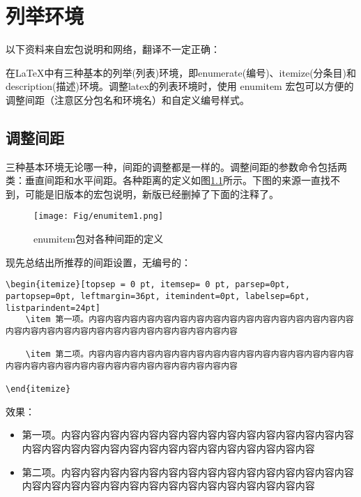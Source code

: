 \chapter{列举环境}
以下资料来自宏包说明和网络，翻译不一定正确：

在LaTeX中有三种基本的列举(列表)环境，即enumerate(编号)、itemize(分条目)和description(描述)环境。调整latex的列表环境时，使用 enumitem 宏包可以方便的调整间距（注意区分包名和环境名）和自定义编号样式。

\section{调整间距}
三种基本环境无论哪一种，间距的调整都是一样的。调整间距的参数命令包括两类：垂直间距和水平间距。各种距离的定义如图\ref{enumitem}所示。下图的来源一直找不到，可能是旧版本的宏包说明，新版已经删掉了下面的注释了。
\begin{figure}[htbp]
	\centering
	\texttt{[image: Fig/enumitem1.png]}
	\caption{\label{enumitem}enumitem包对各种间距的定义}
\end{figure}

现先总结出所推荐的间距设置，无编号的：
\begin{lstlisting}
\begin{itemize}[topsep = 0 pt, itemsep= 0 pt, parsep=0pt, partopsep=0pt, leftmargin=36pt, itemindent=0pt, labelsep=6pt, listparindent=24pt]
	\item 第一项。内容内容内容内容内容内容内容内容内容内容内容内容内容内容内容内容内容内容内容内容内容内容内容内容内容内容内容内容内容内容

	\item 第二项。内容内容内容内容内容内容内容内容内容内容内容内容内容内容内容内容内容内容内容内容内容内容内容内容内容内容内容内容内容内容
	
\end{itemize}
\end{lstlisting}
效果：
\begin{itemize}[topsep = 0 pt, itemsep= 0 pt, parsep=0pt, partopsep=0pt, leftmargin=36pt, itemindent=0pt, labelsep=6pt, listparindent=24pt]
	\item 第一项。内容内容内容内容内容内容内容内容内容内容内容内容内容内容内容内容内容内容内容内容内容内容内容内容内容内容内容内容内容内容

	\item 第二项。内容内容内容内容内容内容内容内容内容内容内容内容内容内容内容内容内容内容内容内容内容内容内容内容内容内容内容内容内容内容
	
\end{itemize}

